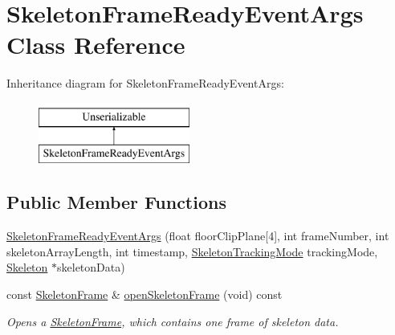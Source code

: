 \hypertarget{class_skeleton_frame_ready_event_args}{\section{\-Skeleton\-Frame\-Ready\-Event\-Args \-Class \-Reference}
\label{class_skeleton_frame_ready_event_args}
}
\-Inheritance diagram for \-Skeleton\-Frame\-Ready\-Event\-Args\-:\begin{figure}[H]
\begin{center}
\leavevmode
\includegraphics[height=2.000000cm]{class_skeleton_frame_ready_event_args}
\end{center}
\end{figure}
\subsection*{\-Public \-Member \-Functions}
\begin{DoxyCompactItemize}
\item 
\hyperlink{class_skeleton_frame_ready_event_args_ae1bb2ae3caac515b6ea3c682c27c5b7f}{\-Skeleton\-Frame\-Ready\-Event\-Args} (float floor\-Clip\-Plane\mbox{[}4\mbox{]}, int frame\-Number, int skeleton\-Array\-Length, int timestamp, \hyperlink{skeleton_tracking_mode_8h_a87402166ea87cd8993f36e03802e3742}{\-Skeleton\-Tracking\-Mode} tracking\-Mode, \hyperlink{class_skeleton}{\-Skeleton} $\ast$skeleton\-Data)
\item 
const \hyperlink{class_skeleton_frame}{\-Skeleton\-Frame} \& \hyperlink{class_skeleton_frame_ready_event_args_aee1c27fa300a98e61b9f5433f07bdac4}{open\-Skeleton\-Frame} (void) const 
\begin{DoxyCompactList}\small\item\em \-Opens a \hyperlink{class_skeleton_frame}{\-Skeleton\-Frame}, which contains one frame of skeleton data. \end{DoxyCompactList}\end{DoxyCompactItemize}



